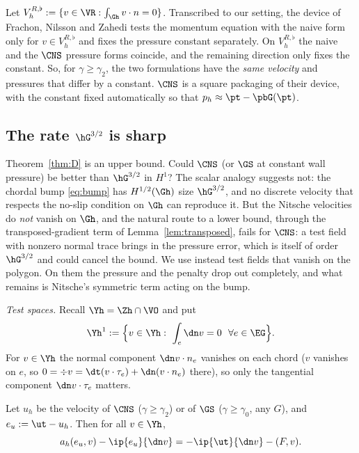 \begin{remark}\label{rem:fnz}
Let $V_h^{R,\flat}:=\{v\in\VR:\int_{\Gh}v\cdot n=0\}$. Transcribed to our setting, the device of Frachon, Nilsson and Zahedi \cite[Section~5.1]{FrachonNilssonZahedi2024} tests the momentum equation with the naive form only for $v\in V_h^{R,\flat}$ and fixes the pressure constant separately. On $V_h^{R,\flat}$ the naive and the $\CNS$ pressure forms coincide, and the remaining direction only fixes the constant. So, for $\gamma\ge\gamma_2$, the two formulations have the \emph{same velocity} and pressures that differ by a constant. $\CNS$ is a square packaging of their device, with the constant fixed automatically so that $p_h\approx\pt-\pbG(\pt)$.
\end{remark}

\subsection{The rate \texorpdfstring{$\hG^{3/2}$}{h^(3/2)} is sharp}\label{sec:lb}
Theorem~\ref{thm:D} is an upper bound. Could $\CNS$ (or $\GS$ at constant wall pressure) be better than $\hG^{3/2}$ in $H^1$? The scalar analogy suggests not: the chordal bump \eqref{eq:bump} has $H^{1/2}(\Gh)$ size $\hG^{3/2}$, and no discrete velocity that respects the no-slip condition on $\Gh$ can reproduce it. But the Nitsche velocities do \emph{not} vanish on $\Gh$, and the natural route to a lower bound, through the transposed-gradient term of Lemma~\ref{lem:transposed}, fails for $\CNS$: a test field with nonzero normal trace brings in the pressure error, which is itself of order $\hG^{3/2}$ and could cancel the bound. We use instead test fields that vanish on the polygon. On them the pressure and the penalty drop out completely, and what remains is Nitsche's symmetric term acting on the bump.

\emph{Test spaces.} Recall $\Yh=\Zh\cap\VO$ and put
\[
\Yh^1:=\Bigl\{v\in\Yh:\ \int_e\dn v=0\ \ \forall e\in\EG\Bigr\}.
\]
For $v\in\Yh$ the normal component $\dn v\cdot n_e$ vanishes on each chord ($v$ vanishes on $e$, so $0=\div v=\dt(v\cdot\tau_e)+\dn(v\cdot n_e)$ there), so only the tangential component $\dn v\cdot\tau_e$ matters.

\begin{lemma}\label{lem:lbid}
Let $u_h$ be the velocity of $\CNS$ ($\gamma\ge\gamma_2$) or of $\GS$ ($\gamma\ge\gamma_0$, any $G$), and $e_u:=\ut-u_h$. Then for all $v\in\Yh$,
\[
a_h(e_u,v)-\ip{e_u}{\dn v}=-\ip{\ut}{\dn v}-(F,v).
\]
\end{lemma}

